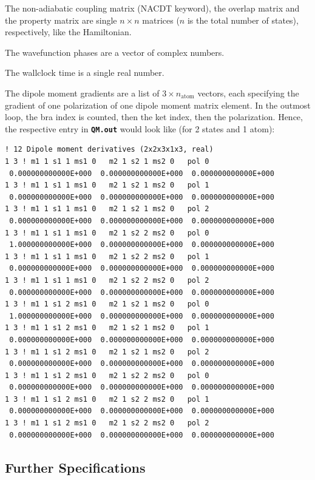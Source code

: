 \documentclass[a4paper,11pt,DIV=15,openany,twoside=false]{scrbook}
\newcommand{\ttt}[1]{\textbf{\texttt{#1}}}
\newenvironment{example}{
  \vspace{0mm}
  \definecolor{shadecolor}{HTML}{E4F4FF}
  \begin{shaded}
}{
  \end{shaded}
}
\begin{document}
The non-adiabatic coupling matrix (NACDT keyword), the overlap matrix and the property matrix are single $n\times n$ matrices ($n$ is the total number of states), respectively, like the Hamiltonian. 

The wavefunction phases are a vector of complex numbers.

The wallclock time is a single real number. 

The dipole moment gradients are a list of $3\times n_\text{atom}$ vectors, each specifying the gradient of one polarization of one dipole moment matrix element. In the outmost loop, the bra index is counted, then the ket index, then the polarization. Hence, the respective entry in \ttt{QM.out} would look like (for 2 states and 1 atom):
\begin{example}
  \begin{verbatim}
! 12 Dipole moment derivatives (2x2x3x1x3, real)
1 3 ! m1 1 s1 1 ms1 0   m2 1 s2 1 ms2 0   pol 0
 0.000000000000E+000  0.000000000000E+000  0.000000000000E+000 
1 3 ! m1 1 s1 1 ms1 0   m2 1 s2 1 ms2 0   pol 1
 0.000000000000E+000  0.000000000000E+000  0.000000000000E+000 
1 3 ! m1 1 s1 1 ms1 0   m2 1 s2 1 ms2 0   pol 2
 0.000000000000E+000  0.000000000000E+000  0.000000000000E+000 
1 3 ! m1 1 s1 1 ms1 0   m2 1 s2 2 ms2 0   pol 0
 1.000000000000E+000  0.000000000000E+000  0.000000000000E+000 
1 3 ! m1 1 s1 1 ms1 0   m2 1 s2 2 ms2 0   pol 1
 0.000000000000E+000  0.000000000000E+000  0.000000000000E+000 
1 3 ! m1 1 s1 1 ms1 0   m2 1 s2 2 ms2 0   pol 2
 0.000000000000E+000  0.000000000000E+000  0.000000000000E+000 
1 3 ! m1 1 s1 2 ms1 0   m2 1 s2 1 ms2 0   pol 0
 1.000000000000E+000  0.000000000000E+000  0.000000000000E+000 
1 3 ! m1 1 s1 2 ms1 0   m2 1 s2 1 ms2 0   pol 1
 0.000000000000E+000  0.000000000000E+000  0.000000000000E+000 
1 3 ! m1 1 s1 2 ms1 0   m2 1 s2 1 ms2 0   pol 2
 0.000000000000E+000  0.000000000000E+000  0.000000000000E+000 
1 3 ! m1 1 s1 2 ms1 0   m2 1 s2 2 ms2 0   pol 0
 0.000000000000E+000  0.000000000000E+000  0.000000000000E+000 
1 3 ! m1 1 s1 2 ms1 0   m2 1 s2 2 ms2 0   pol 1
 0.000000000000E+000  0.000000000000E+000  0.000000000000E+000 
1 3 ! m1 1 s1 2 ms1 0   m2 1 s2 2 ms2 0   pol 2
 0.000000000000E+000  0.000000000000E+000  0.000000000000E+000 
  \end{verbatim}
\end{example}

\subsection{Further Specifications}
\end{document}
